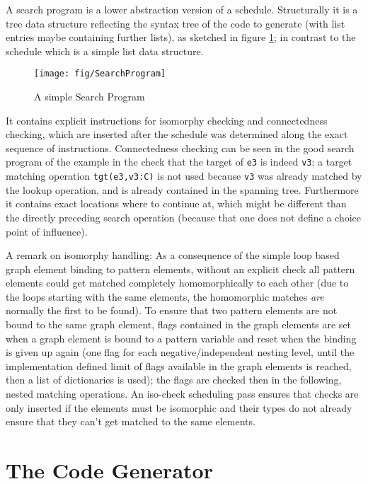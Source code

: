 A search program is a lower abstraction version of a schedule.
Structurally it is a tree data structure reflecting the syntax tree of the code to generate (with list entries maybe containing further lists), as sketched in figure \ref{figsearchprogram}; in contrast to the schedule which is a simple list data structure.

\begin{figure}[htbp]
  \centering
  \texttt{[image: fig/SearchProgram]}
  \caption{A simple Search Program}
  \label{figsearchprogram}
\end{figure}

It contains explicit instructions for isomorphy checking and connectedness checking, which are inserted after the schedule was determined along the exact sequence of instructions.
Connectedness checking can be seen in the good search program of the example in the check that the target of \texttt{e3} is indeed \texttt{v3};
a target matching operation \texttt{tgt(e3,v3:C)} is not used because \texttt{v3} was already matched by the lookup operation, and is already contained in the spanning tree.
Furthermore it contains exact locations where to continue at, which might be different than the directly preceding search operation (because that one does not define a choice point of influence).

A remark on isomorphy handling: As a consequence of the simple loop based graph element binding to pattern elements, without an explicit check all pattern elements could get matched completely homomorphically to each other (due to the loops starting with the same elements, the homomorphic matches \emph{are} normally the first to be found).
To ensure that two pattern elements are not bound to the same graph element, flags contained in the graph elements are set when a graph element is bound to a pattern variable and reset when the binding is given up again (one flag for each negative/independent nesting level, until the implementation defined limit of flags available in the graph elements is reached, then a list of dictionaries is used); the flags are checked then in the following, nested matching operations. An iso-check scheduling pass ensures that checks are only inserted if the elements must be isomorphic and their types do not already ensure that they can't get matched to the same elements.


\section{The Code Generator}

